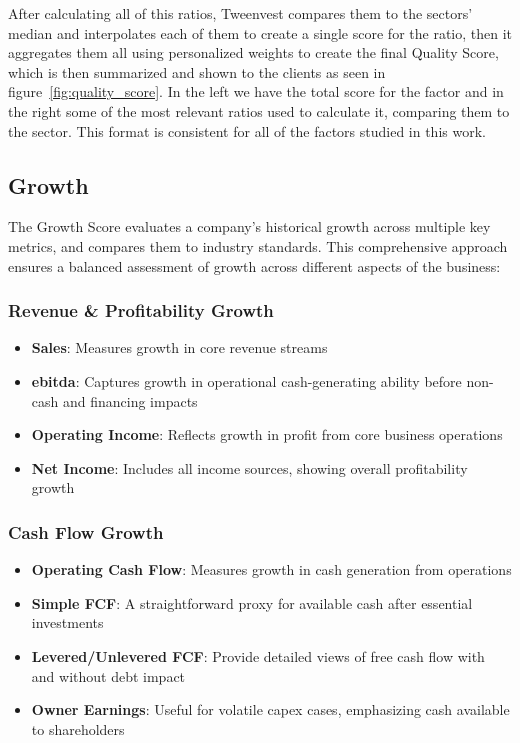 \documentclass[11pt,english,a4paper,hidelinks]{book}
\begin{document}
\noindent After calculating all of this ratios, Tweenvest compares them to the sectors' median and interpolates each of them to create a single score for the ratio, then it aggregates them all using personalized weights to create the final Quality Score, which is then summarized and shown to the clients as seen in figure~\ref{fig:quality_score}. In the left we have the total score for the factor and in the right some of the most relevant ratios used to calculate it, comparing them to the sector. This format is consistent for all of the factors studied in this work.


\subsection{Growth}
\noindent The Growth Score evaluates a company's historical growth across multiple key metrics, and compares them to industry standards. This comprehensive approach ensures a balanced assessment of growth across different aspects of the business:

\subsubsection{Revenue \& Profitability Growth}
\begin{itemize}
    \item \textbf{Sales}: Measures growth in core revenue streams
    \item \textbf{\acrshort{ebitda}}: Captures growth in operational cash-generating ability before non-cash and financing impacts
    \item \textbf{Operating Income}: Reflects growth in profit from core business operations
    \item \textbf{Net Income}: Includes all income sources, showing overall profitability growth
\end{itemize}

\subsubsection{Cash Flow Growth}
\begin{itemize}
    \item \textbf{Operating Cash Flow}: Measures growth in cash generation from operations
    \item \textbf{Simple FCF}: A straightforward proxy for available cash after essential investments
    \item \textbf{Levered/Unlevered FCF}: Provide detailed views of free cash flow with and without debt impact
    \item \textbf{Owner Earnings}: Useful for volatile capex cases, emphasizing cash available to shareholders
\end{itemize}
\end{document}
